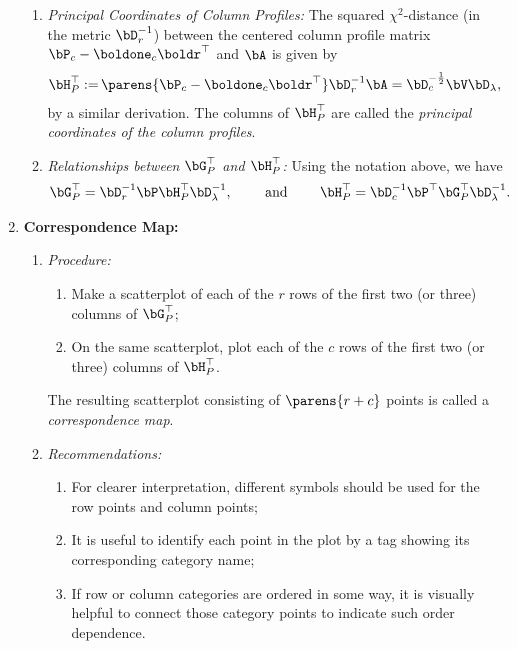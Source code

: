 \documentclass[12pt]{article}
\begin{document}
\begin{enumerate}[label=\textbf{\arabic*.}]
\begin{enumerate}
		\item \textit{Principal Coordinates of Column Profiles:} The squared $\chi^2$-distance (in the metric $\bD_r^{-1}$) between the centered column profile matrix $\bP_c - \boldone_c \boldr^\top$ and $\bA$ is given by 
		\begin{align*}
			\bH_P^\top := & \, \parens{\bP_c - \boldone_c \boldr^\top} \bD_r^{-1} \bA = \bD_c^{-\frac{1}{2}} \bV \bD_{\lambda}, 
		\end{align*}
		by a similar derivation. The columns of $\bH_P^{\top}$ are called the \emph{principal coordinates of the column profiles}. 
		
		\item \textit{Relationships between $\bG_P^{\top}$ and $\bH_P^{\top}$:} Using the notation above, we have 
		\begin{align*}
			\bG_P^\top = \bD_{r}^{-1} \bP \bH_P^{\top} \bD_{\lambda}^{-1}, \qquad \text{ and } \qquad \bH_P^\top = \bD_c^{-1} \bP^\top \bG_P^{\top} \bD_{\lambda}^{-1}. 
		\end{align*}
	\end{enumerate}
	
	\item \textbf{Correspondence Map:} 
	\begin{enumerate}
		\item \textit{Procedure:} 
		\begin{enumerate}[label=(\arabic*)]
			\item Make a scatterplot of each of the $r$ rows of the first two (or three) columns of $\bG_P^{\top}$; 
			\item On the same scatterplot, plot each of the $c$ rows of the first two (or three) columns of $\bH_P^{\top}$. 
		\end{enumerate}
		The resulting scatterplot consisting of $\parens{r + c}$ points is called a \emph{correspondence map}. 
		
		\item \textit{Recommendations:} 
		\begin{enumerate}
			\item For clearer interpretation, different symbols should be used for the row points and column points; 
			\item It is useful to identify each point in the plot by a tag showing its corresponding category name; 
			\item If row or column categories are ordered in some way, it is visually helpful to connect those category points to indicate such order dependence. 
		\end{enumerate}
		

\end{enumerate}
\end{enumerate}
\end{document}
